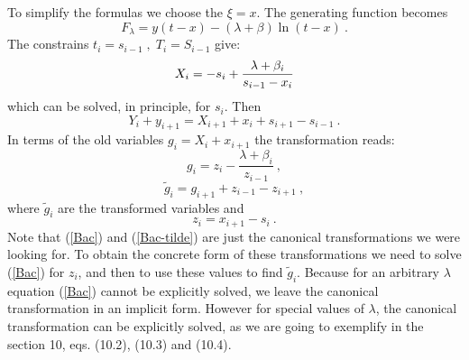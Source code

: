 \documentclass[a4paper,11pt]{article}
\begin{document}
To simplify the formulas we choose the $\xi=x$. The generating function
becomes
\begin{equation}
\label{Fs}
F_{\lambda}=y(t-x)-(\lambda +\beta)\ln(t-x) ~.
\end{equation}
The constrains $t_i=s_{i-1}\;,\;T_i=S_{i-1}$  give:
\begin{equation}
\label{si1}
X_i=-s_i+\frac{\lambda +\beta_i}{s_{i-1}-x_i}\\
\end{equation}
which can be solved, in principle, for $s_i$. Then
\begin{equation}
\label{si2}
Y_i+y_{i+1}=X_{i+1}+x_i+s_{i+1}-s_{i-1} ~.
\end{equation}
In terms of the old variables $g_i=X_i+x_{i+1}$ the transformation reads:
\begin{equation}
\label{Bac}
    g_i=z_i-\frac{\lambda +\beta _{i}}{z_{i-1}} ~,
\end{equation}
\begin{equation}
\label{Bac-tilde}
    {\tilde g}_i=g_{i+1}+z_{i-1}-z_{i+1} ~,
\end{equation}
where ${\tilde g}_i$ are the transformed variables and
\begin{equation}
\label{z}
 z_i=x_{i+1}-s_i ~.
\end{equation} Note that (\ref{Bac}) and (\ref{Bac-tilde}) are just the
canonical transformations we were looking for. To obtain the
concrete form of these transformations we need to solve
(\ref{Bac}) for $z_i$, and then to use these values to find
${\tilde g}_i$. Because for an arbitrary $\lambda$ equation
(\ref{Bac}) cannot be explicitly solved, we leave the canonical
transformation in an implicit form. However for special values of
$\lambda$, the canonical transformation can be explicitly solved,
as we are going to exemplify in the section 10, eqs. (10.2),
(10.3) and (10.4).
\end{document}
